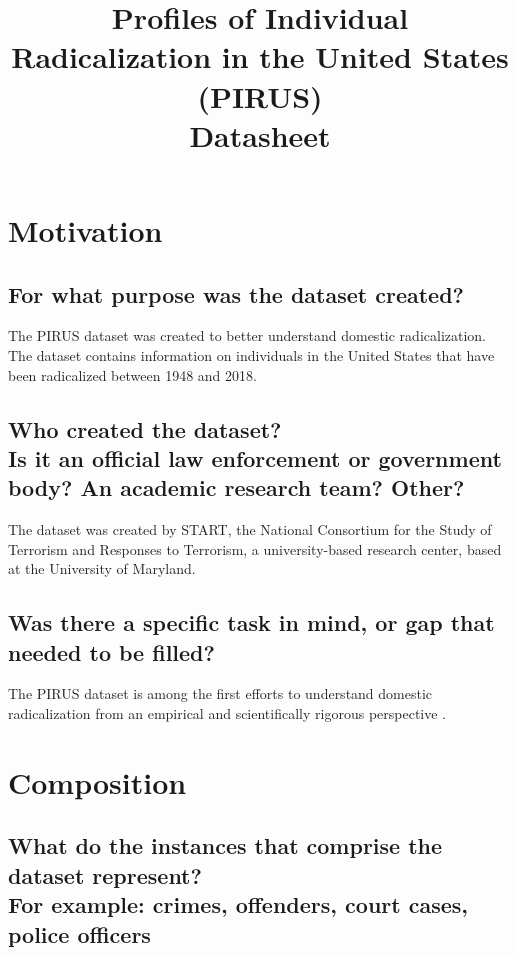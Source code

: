 \documentclass[letterpaper, 10 pt, conference]{ieeeconf}  %
\title{\LARGE \bf
Profiles of Individual Radicalization in the United States (PIRUS) \\{\color{blue}Datasheet}
}
\newcommand{\subtitle}[1]{{\\ \small \normalfont \color{purple} #1}}
\begin{document}
\maketitle
\thispagestyle{empty}
\pagestyle{empty}

\section{Motivation}

\subsection{For what purpose was the dataset created?}

The PIRUS dataset was created to better understand domestic radicalization. The dataset contains information on individuals in the United States that have been radicalized between 1948 and 2018.

\subsection{Who created the dataset? \subtitle{Is it an official law enforcement or government body? An academic research team? Other?}}

The dataset was created by START, the National Consortium for the Study of Terrorism and Responses to Terrorism, a university-based research center, based at the University of Maryland. 

\subsection{Was there a specific task in mind, or gap that needed to be filled?}

The PIRUS dataset is among the first efforts to understand domestic radicalization from an empirical and scientifically rigorous perspective \cite{mcfee2019profiles}.


\section{Composition}

\subsection{What do the instances that comprise the dataset represent? \subtitle{For example: crimes, offenders, court cases, police officers}}
\end{document}
